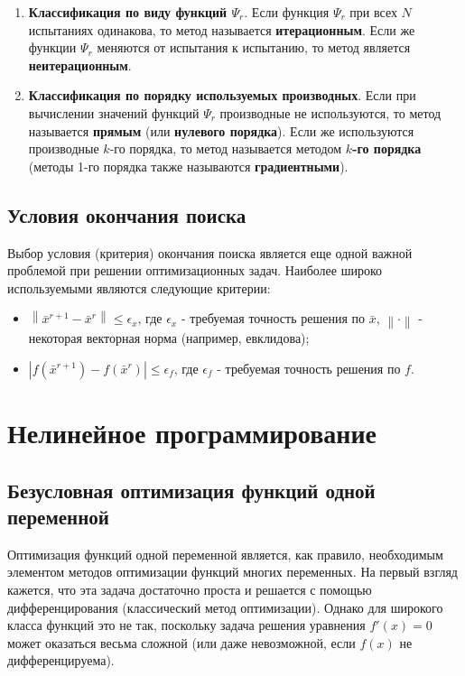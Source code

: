 \documentclass[a4paper,12pt]{report}
\begin{document}
\begin{enumerate}
\item \textbf{Классификация по виду функций $\Psi_{r}$}. Если функция $\Psi_{r}$ при всех $N$ испытаниях одинакова, то метод называется \textbf{итерационным}. Если же функции $\Psi_{r}$ меняются от испытания к испытанию, то метод является \textbf{неитерационным}.
\item \textbf{Классификация по порядку используемых производных}. Если при вычислении значений функций $\Psi_{r}$ производные не используются, то метод называется \textbf{прямым} (или \textbf{нулевого порядка}). Если же используются производные $k$-го порядка, то метод называется методом \textbf{$k$-го порядка} (методы 1-го порядка также называются \textbf{градиентными}).
\end{enumerate}

\section{Условия окончания поиска}
Выбор условия (критерия) окончания поиска является еще одной важной проблемой при решении оптимизационных задач. Наиболее широко используемыми являются следующие критерии:
\begin{itemize}
\item $\left\|\bar{x}^{r+1} - \bar{x}^{r}\right\| \leq \epsilon_{x}$, где $\epsilon_{x}$ - требуемая точность решения по $\bar{x}$, $\left\|\cdot\right\|$ - некоторая векторная норма (например, евклидова);
\item $\left|f(\bar{x}^{r+1}) - f(\bar{x}^{r})\right| \leq \epsilon_{f}$, где $\epsilon_{f}$ - требуемая точность решения по $f$.
\end{itemize}

\chapter{Нелинейное программирование}

\section{Безусловная оптимизация функций одной переменной}
Оптимизация функций одной переменной является, как правило, необходимым элементом методов оптимизации функций многих переменных. На первый взгляд кажется, что эта задача достаточно проста и решается с помощью дифференцирования (классический метод оптимизации). Однако для широкого класса функций это не так, поскольку задача решения уравнения $f'(x) = 0$ может оказаться весьма сложной (или даже невозможной, если $f(x)$ не дифференцируема).
\end{document}
